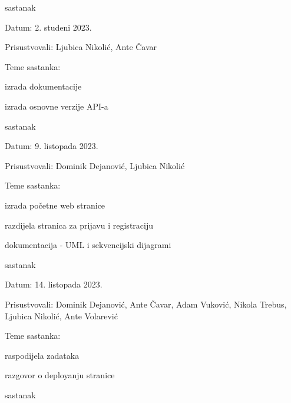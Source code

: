 \begin{packed_enum}
			
			\item  sastanak
			\item[] \begin{packed_item}
				\item Datum: 2. studeni 2023.
				\item Prisustvovali: Ljubica Nikolić, Ante Čavar
				\item Teme sastanka: 
				\begin{packed_item}
					\item izrada dokumentacije
					\item izrada osnovne verzije API-a
				\end{packed_item}
			\end{packed_item}
			
			\item  sastanak
			\item[] \begin{packed_item}
				\item Datum: 9. listopada 2023.
				\item Prisustvovali: Dominik Dejanović, Ljubica Nikolić
				\item Teme sastanka:
				\begin{packed_item}
					\item izrada početne web stranice
					\item razdijela stranica za prijavu i registraciju
					\item dokumentacija - UML i sekvencijski dijagrami
				\end{packed_item}
			\end{packed_item}
			
			\item  sastanak
			\item[] \begin{packed_item}
				\item Datum: 14. listopada 2023.
				\item Prisustvovali: Dominik Dejanović, Ante Čavar, Adam Vuković, Nikola Trebus, Ljubica Nikolić, Ante Volarević
				\item Teme sastanka:
				\begin{packed_item}
					\item raspodijela zadataka
					\item razgovor o deployanju stranice
				\end{packed_item}
			\end{packed_item}
			
			\item  sastanak
			
			
		\end{packed_enum}
		
